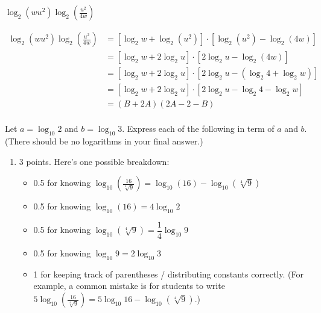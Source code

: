 \documentclass{article}
\begin{document}
\begin{enumerate}
\begin{enumerate}
    \begin{problem}[\vfill\newpage]
      $\displaystyle \log_2 \left( w u^2 \right) \log_2 \left( \frac{u^2}{4w} \right)$
    \end{problem}

    \begin{solution}
      \begin{align*}
        \log_2 \left( w u^2 \right) \log_2 \left( \frac{u^2}{4w} \right)
        &= \left[\log_2 w + \log_2 (u^2)\right] \cdot
        \left[\log_2(u^2)-\log_2(4w) \right] \\
        &= \left[\log_2 w + 2\log_2 u\right] \cdot
        \left[2 \log_2 u-\log_2(4w) \right] \\
        &= \left[\log_2 w + 2\log_2 u\right] \cdot
        \left[2 \log_2 u-(\log_2 4 + \log_2 w) \right] \\
        &= \left[\log_2 w + 2\log_2 u\right] \cdot
        \left[2 \log_2 u-\log_2 4 - \log_2 w \right] \\
        &= \boxed{(B + 2A)(2 A-2 - B)} \\
      \end{align*}
    \end{solution}

  \end{enumerate}

  Let $a = \log_{10} 2$ and $b = \log_{10} 3$. Express each of the following in term of $a$ and $b$. (There should be no logarithms in your final answer.)

  \begin{enumerate}[resume]
  \item

    \begin{grading}
      3 points. Here's one possible breakdown:
      \begin{itemize}[nosep]
      \item 0.5 for knowing $\displaystyle \log_{10} \left( \frac{16}{\sqrt[4]{9}} \right) = \log_{10}(16) - \log_{10} (\sqrt[4]{9})$
      \item 0.5 for knowing $\log_{10} (16) = 4 \log_{10} 2$
      \item 0.5 for knowing $\log_{10} (\sqrt[4]{9}) = \dfrac{1}{4} \log_{10} 9$
      \item 0.5 for knowing $\log_{10} 9 = 2 \log_{10} 3$
      \item 1 for keeping track of parentheses / distributing constants correctly. (For example, a common mistake is for students to write $\displaystyle 5 \log_{10} \left( \frac{16}{\sqrt[4]{9}} \right) = 5 \log_{10} 16 - \log_{10} \left( \sqrt[4]{9} \right)$.) 
      \end{itemize}
    \end{grading}


\end{enumerate}
\end{enumerate}
\end{document}

